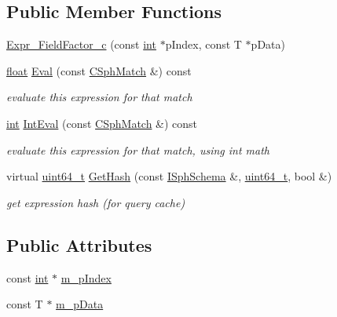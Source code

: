 \subsection*{Public Member Functions}
\begin{DoxyCompactItemize}
\item 
\hyperlink{structExpr__FieldFactor__c_a3fa7bbc47099a8c6c0285be1e52f3605}{Expr\-\_\-\-Field\-Factor\-\_\-c} (const \hyperlink{sphinxexpr_8cpp_a4a26e8f9cb8b736e0c4cbf4d16de985e}{int} $\ast$p\-Index, const T $\ast$p\-Data)
\item 
\hyperlink{sphinxexpr_8cpp_a0e0d0739f7035f18f949c2db2c6759ec}{float} \hyperlink{structExpr__FieldFactor__c_ad0bf8dda892ea2aed906984590eff5a4}{Eval} (const \hyperlink{classCSphMatch}{C\-Sph\-Match} \&) const 
\begin{DoxyCompactList}\small\item\em evaluate this expression for that match \end{DoxyCompactList}\item 
\hyperlink{sphinxexpr_8cpp_a4a26e8f9cb8b736e0c4cbf4d16de985e}{int} \hyperlink{structExpr__FieldFactor__c_a75d15e44ac386cf7a9516d5ec64e0561}{Int\-Eval} (const \hyperlink{classCSphMatch}{C\-Sph\-Match} \&) const 
\begin{DoxyCompactList}\small\item\em evaluate this expression for that match, using int math \end{DoxyCompactList}\item 
virtual \hyperlink{sphinxstd_8h_aaa5d1cd013383c889537491c3cfd9aad}{uint64\-\_\-t} \hyperlink{structExpr__FieldFactor__c_a9e663cdfa2376d3e0b25a2641d876b8b}{Get\-Hash} (const \hyperlink{classISphSchema}{I\-Sph\-Schema} \&, \hyperlink{sphinxstd_8h_aaa5d1cd013383c889537491c3cfd9aad}{uint64\-\_\-t}, bool \&)
\begin{DoxyCompactList}\small\item\em get expression hash (for query cache) \end{DoxyCompactList}\end{DoxyCompactItemize}
\subsection*{Public Attributes}
\begin{DoxyCompactItemize}
\item 
const \hyperlink{sphinxexpr_8cpp_a4a26e8f9cb8b736e0c4cbf4d16de985e}{int} $\ast$ \hyperlink{structExpr__FieldFactor__c_af43b72a2e95943784565048c23d1b32c}{m\-\_\-p\-Index}
\item 
const T $\ast$ \hyperlink{structExpr__FieldFactor__c_ab8a2a4f48d8b7b313288eb67ad2170ec}{m\-\_\-p\-Data}
\end{DoxyCompactItemize}

